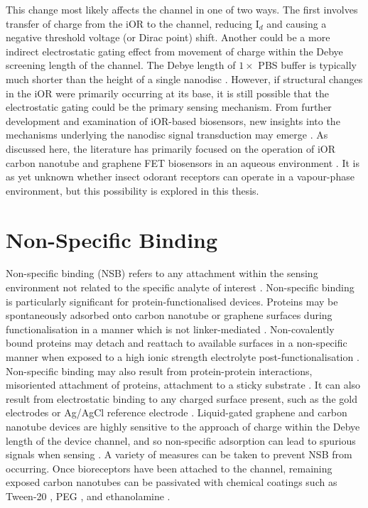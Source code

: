\documentclass[
  a4paper,
]{scrbook}
\begin{document}
This change most likely affects the channel in one of two ways. The
first involves transfer of charge from the iOR to the channel, reducing
I\(_{d}\) and causing a negative threshold voltage (or Dirac point)
shift. Another could be a more indirect electrostatic gating effect from
movement of charge within the Debye screening length of the channel. The
Debye length of \(1 \times\) PBS buffer is typically much shorter than
the height of a single nanodisc \autocite{Murugathas2019a}. However, if
structural changes in the iOR were primarily occurring at its base, it
is still possible that the electrostatic gating could be the primary
sensing mechanism. From further development and examination of iOR-based
biosensors, new insights into the mechanisms underlying the nanodisc
signal transduction may emerge \autocite{Glatz2011}. As discussed here,
the literature has primarily focused on the operation of iOR carbon
nanotube and graphene FET biosensors in an aqueous environment
\autocite{Murugathas2019a,Murugathas2020}. It is as yet unknown whether
insect odorant receptors can operate in a vapour-phase environment, but
this possibility is explored in this thesis.

\hypertarget{sec-non-specific-binding}{%
\section{Non-Specific Binding}\label{sec-non-specific-binding}}

Non-specific binding (NSB) refers to any attachment within the sensing
environment not related to the specific analyte of interest
\autocite{Lichtenberg2019,Shkodra2021}. Non-specific binding is
particularly significant for protein-functionalised devices. Proteins
may be spontaneously adsorbed onto carbon nanotube or graphene surfaces
during functionalisation in a manner which is not linker-mediated
\autocite{Bradley2004,Star2003a,Chen2004}. Non-covalently bound proteins
may detach and reattach to available surfaces in a non-specific manner
when exposed to a high ionic strength electrolyte post-functionalisation
\autocite{Dung2018}. Non-specific binding may also result from
protein-protein interactions, misoriented attachment of proteins,
attachment to a sticky substrate \autocite{Chen2004,Lichtenberg2019}. It
can also result from electrostatic binding to any charged surface
present, such as the gold electrodes \autocite{Garcia-Aljaro2010} or
Ag/AgCl reference electrode
\autocite{Chen2004,Minot2007,Lichtenberg2019}. Liquid-gated graphene and
carbon nanotube devices are highly sensitive to the approach of charge
within the Debye length of the device channel, and so non-specific
adsorption can lead to spurious signals when sensing
\autocite{Star2003a,Chen2004,Lichtenberg2019,Shkodra2021}. A variety of
measures can be taken to prevent NSB from occurring. Once bioreceptors
have been attached to the channel, remaining exposed carbon nanotubes
can be passivated with chemical coatings such as Tween-20
\autocite{Chen2004}, PEG
\autocite{Star2003a,Lee2012b,Gao2016,Filipiak2018}, and ethanolamine
\autocite{Maehashi2007,Das2011}.
\end{document}
